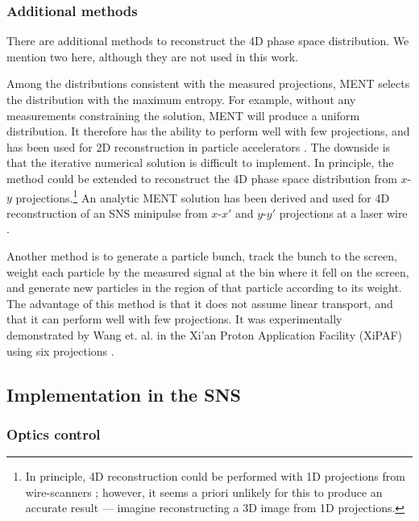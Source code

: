 \subsubsection{Additional methods}

There are additional methods to reconstruct the 4D phase space distribution. We mention two here, although they are not used in this work.

Among the distributions consistent with the measured projections, MENT selects the distribution with the maximum entropy. For example, without any measurements constraining the solution, MENT will produce a uniform distribution. It therefore has the ability to perform well with few projections, and has been used for 2D reconstruction in particle accelerators \cite{Hock2013a}. The downside is that the iterative numerical solution is difficult to implement. In principle, the method could be extended to reconstruct the 4D phase space distribution from $x$-$y$ projections.\footnote{In principle, 4D reconstruction could be performed with 1D projections from wire-scanners \cite{Sander1979}; however, it seems a priori unlikely for this to produce an accurate result — imagine reconstructing a 3D image from 1D projections.} An analytic MENT solution has been derived and used for 4D reconstruction of an SNS minipulse from $x$-$x'$ and $y$-$y'$ projections at a laser wire \cite{Wong-forthcoming}. 

Another method is to generate a particle bunch, track the bunch to the screen, weight each particle by the measured signal at the bin where it fell on the screen, and generate new particles in the region of that particle according to its weight. The advantage of this method is that it does not assume linear transport, and that it can perform well with few projections. It was experimentally demonstrated by Wang et. al. in the Xi’an Proton Application Facility (XiPAF) using six projections \cite{Wang2019}. 



\subsection{Implementation in the SNS}

\subsubsection{Optics control}

